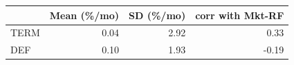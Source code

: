 \begin{tabular}{lrrr}
\toprule
 & Mean (\%/mo) & SD (\%/mo) & corr with Mkt-RF \\
\midrule
TERM & 0.04 & 2.92 & 0.33 \\
DEF & 0.10 & 1.93 & -0.19 \\
\bottomrule
\end{tabular}
